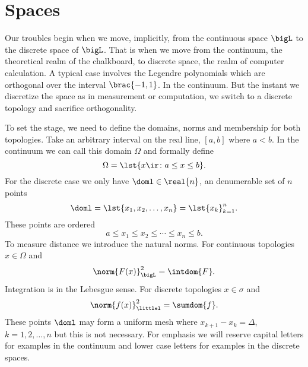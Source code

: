 \section{Spaces}

Our troubles begin when we move, implicitly, from the continuous space $\bigL$ to the discrete space of $\bigL$. That is when we move from the continuum, the theoretical realm of the chalkboard, to discrete space, the realm of computer calculation. A typical case involves the Legendre polynomials which are orthogonal over the interval $\brac{-1,1}$. In the continuum. But the instant we discretize the space as in measurement or computation, we switch to a discrete topology and sacrifice orthogonality.

To set the stage, we need to define the domains, norms and membership for both topologies. Take an arbitrary interval on the real line, $[a,b]$ where $a<b$. In the continuum we can call this domain $\Omega$ and formally define
  \begin{equation}
    \Omega = \lst{x\ir\colon a \le x \le b}.
    \label{eq:domain:L}
  \end{equation}
For the discrete case we only have $\doml\in\real{n}$, an denumerable set of $n$ points
  \begin{equation}
    \doml = \lst{x_{1}, x_{2}, \dots, x_{n}} = \lst{x_{k}}_{k=1}^{n} .
    \label{eq:domain:l}
  \end{equation}
These points are ordered
  \begin{equation}
    a \le x_{1} \le x_{2} \le \cdots \le x_{n} \le b .
  \end{equation}
To measure distance we introduce the natural norms. For continuous topologies $x\in\Omega$ and
  \begin{equation}
    \norm{F(x)}_{\bigL}^{2} = \intdom{F} .
    \label{eq:norm:L}
  \end{equation}
Integration is in the Lebesgue sense. For discrete topologies $x\in\sigma$ and
  \begin{equation}
    \norm{f(x)}_{\littlel}^{2} = \sumdom{f} .
    \label{eq:norm:l}
  \end{equation}
These points $\doml$ may form a uniform mesh where $x_{k+1} - x_{k} = \Delta$, $k=1,2,\dots,n$ but this is not necessary.
For emphasis we will reserve capital letters for examples in the continuum and lower case letters for examples in the discrete spaces.

